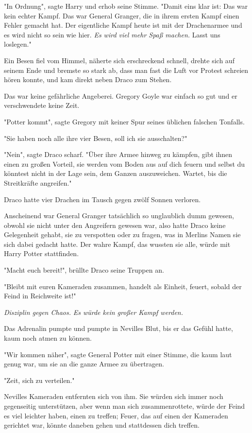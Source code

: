 {"In Ordnung", sagte Harry und erhob seine Stimme. "Damit eins klar ist: Das war kein echter Kampf. Das war General Granger, die in ihrem ersten Kampf einen Fehler gemacht hat. Der eigentliche Kampf heute ist mit der Drachenarmee und es wird nicht so sein wie hier. \emph{Es wird viel mehr Spaß machen.} Lasst uns loslegen."

Ein Besen fiel vom Himmel, näherte sich erschreckend schnell, drehte sich auf seinem Ende und bremste so stark ab, dass man fast die Luft vor Protest schreien hören konnte, und kam direkt neben Draco zum Stehen.

Das war keine gefährliche Angeberei. Gregory Goyle war einfach so gut und er verschwendete keine Zeit.

"Potter kommt", sagte Gregory mit keiner Spur seines üblichen falschen Tonfalls.

"Sie haben noch alle ihre vier Besen, soll ich sie ausschalten?"

"Nein", sagte Draco scharf. "Über ihre Armee hinweg zu kämpfen, gibt ihnen einen zu großen Vorteil, sie werden vom Boden aus auf dich feuern und selbst du könntest nicht in der Lage sein, dem Ganzen auszuweichen. Wartet, bis die Streitkräfte angreifen."

Draco hatte vier Drachen im Tausch gegen zwölf Sonnen verloren.

Anscheinend war General Granger tatsächlich so unglaublich dumm gewesen, obwohl sie nicht unter den Angreifern gewesen war, also hatte Draco keine Gelegenheit gehabt, sie zu verspotten oder zu fragen, was in Merlins Namen sie sich dabei gedacht hatte. Der wahre Kampf, das wussten sie alle, würde mit Harry Potter stattfinden.

"Macht euch bereit!", brüllte Draco seine Truppen an.

"Bleibt mit euren Kameraden zusammen, handelt als Einheit, feuert, sobald der Feind in Reichweite ist!"

\emph{Disziplin gegen Chaos.} \emph{Es würde kein großer Kampf werden.}

Das Adrenalin pumpte und pumpte in Nevilles Blut, bis er das Gefühl hatte, kaum noch atmen zu können.

"Wir kommen näher", sagte General Potter mit einer Stimme, die kaum laut genug war, um sie an die ganze Armee zu übertragen.

"Zeit, sich zu verteilen."

Nevilles Kameraden entfernten sich von ihm. Sie würden sich immer noch gegenseitig unterstützen, aber wenn man sich zusammenrottete, würde der Feind es viel leichter haben, einen zu treffen; Feuer, das auf einen der Kameraden gerichtet war, könnte daneben gehen und stattdessen dich treffen.

}
